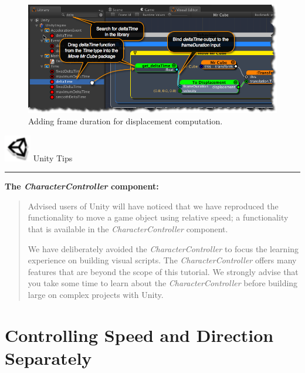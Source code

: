 \begin{figure}[htbp]
\centering
\includegraphics[keepaspectratio,width=\textwidth,height=0.75\textheight]{adding-delta-time.png}
\caption{Adding frame duration for displacement computation.}
\label{adding-delta-time.png}
\end{figure}
\begin{tipbox}

\includegraphics[width=33pt,height=33pt]{UnityLogo_32x32.png} {\Large \color{black} Unity Tips }

\begin{center}\rule{\textwidth}{0.4pt}\end{center}

\textbf{The \emph{CharacterController} component:}

\begin{quote}

Advised users of Unity will have noticed that we have reproduced the functionality to move a game object using relative speed; a functionality that is available in the \emph{CharacterController} component.

We have deliberately avoided the \emph{CharacterController} to focus the learning experience on building visual scripts. The \emph{CharacterController} offers many features that are beyond the scope of this tutorial. We strongly advise that you take some time to learn about the \emph{CharacterController} before building large on complex projects with Unity.
\end{quote}

\end{tipbox}



\section{Controlling Speed and Direction Separately}
\label{controllingspeedanddirectionseparately}

